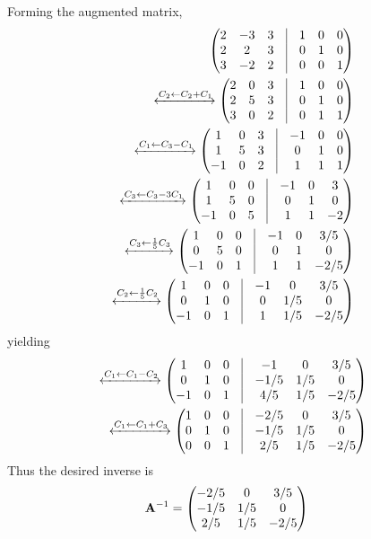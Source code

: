 Forming the augmented matrix,
\begin{align}
	\myvec{
		2 & -3 & 3 & \vrule & 1 & 0 & 0 \\
		2 & 2 & 3 & \vrule & 0 & 1 & 0 \\ 
		3 & -2 & 2 & \vrule & 0 & 0 & 1\\
	}
	\\
	\xleftrightarrow[]{C_2 \leftarrow C_2 + C_1}
	\myvec{
		2 & 0 & 3 & \vrule & 1 & 0 & 0 \\
		2 & 5 & 3 & \vrule & 0 & 1 & 0 \\ 
		3 & 0 & 2 & \vrule & 0 & 1 & 1\\
	}
	\\
	\xleftrightarrow[]{C_1\leftarrow C_3 - C_1}
	\myvec{
		1 & 0 & 3 & \vrule & -1 & 0 & 0 \\
		1 & 5 & 3 & \vrule & 0 & 1 & 0 \\ 
		-1 & 0 & 2 & \vrule & 1 & 1 & 1\\
	}
	\\
	\xleftrightarrow[]{C_3 \leftarrow C_3 - 3C_1}
	\myvec{
		1 & 0 & 0 & \vrule & -1 & 0 & 3 \\
		1 & 5 & 0 & \vrule & 0 & 1 & 0 \\ 
		-1 & 0 & 5 & \vrule & 1 & 1 & -2\\
	}
	\\
	\xleftrightarrow[]{C_3 \leftarrow \frac{1}{5}C_3}
	\myvec{
		1 & 0 & 0 & \vrule & -1 & 0 & 3/5 \\
		0 & 5 & 0 & \vrule & 0 & 1 & 0 \\ 
		-1 & 0 & 1 & \vrule & 1 & 1 & -2/5\\
	}
	\\
	\xleftrightarrow[]{C_2 \leftarrow \frac{1}{5}C_2}
	\myvec{
		1 & 0 & 0 & \vrule & -1 & 0 & 3/5 \\
		0 & 1 & 0 & \vrule & 0 & 1/5 & 0 \\ 
		-1 & 0 & 1 & \vrule & 1 & 1/5 & -2/5\\
	}
\end{align}
yielding
\begin{align}
    \xleftrightarrow[]{C_1 \leftarrow C_1 - C_2}
	\myvec{
		1 & 0 & 0 & \vrule & -1 & 0 & 3/5 \\
		0 & 1 & 0 & \vrule & -1/5 & 1/5 & 0 \\ 
		-1 & 0 & 1 & \vrule & 4/5 & 1/5 & -2/5\\
	}
	\\
	\xleftrightarrow[]{C_1 \leftarrow C_1 + C_3}
	\myvec{
		1 & 0 & 0 & \vrule & -2/5 & 0 & 3/5 \\
		0 & 1 & 0 & \vrule & -1/5 & 1/5 & 0 \\ 
		0 & 0 & 1 & \vrule & 2/5 & 1/5 & -2/5\\
	}
\end{align}
Thus the desired inverse is 
\begin{align}
\mathbf {A}^{-1} &= {\begin{pmatrix} -2/5 & 0 & 3/5\\-1/5 & 1/5 & 0\\2/5 & 1/5 & -2/5\end{pmatrix}}
\end{align}
